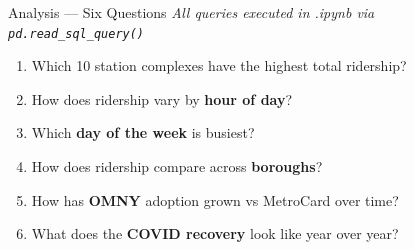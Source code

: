 \documentclass{beamer}
\begin{document}
	\begin{frame}{Analysis — Six Questions}
		\centering
		\textit{All queries executed in .ipynb via \texttt{pd.read\_sql\_query()}}\\
		\vspace{0.5cm}
		\begin{enumerate}
			\item[\textcolor{accentBlue}{\textbf{Q1}}]
			Which 10 station complexes have the highest total ridership?
			\item[\textcolor{mtaRed}{\textbf{Q2}}]
			How does ridership vary by \textbf{hour of day}?
			\item[\textcolor{mtaGreen}{\textbf{Q3}}]
			Which \textbf{day of the week} is busiest?
			\item[\textcolor{mtaOrange}{\textbf{Q4}}]
			How does ridership compare across \textbf{boroughs}?
			\item[\textcolor{mtaYellow}{\textbf{Q5}}]
			How has \textbf{OMNY} adoption grown vs MetroCard over time?
			\item[\textcolor{accentBlue}{\textbf{Q6}}]
			What does the \textbf{COVID recovery} look like year over year?
		\end{enumerate}
	\end{frame}
	
\end{document}

